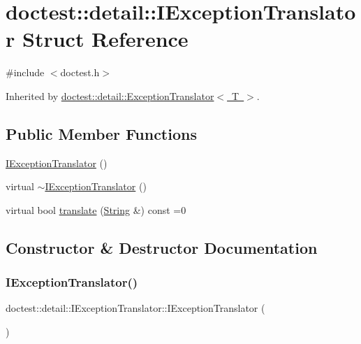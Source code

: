 \hypertarget{structdoctest_1_1detail_1_1_i_exception_translator}{}\section{doctest\+:\+:detail\+:\+:I\+Exception\+Translator Struct Reference}
\label{structdoctest_1_1detail_1_1_i_exception_translator}


{\ttfamily \#include $<$doctest.\+h$>$}



Inherited by \mbox{\hyperlink{classdoctest_1_1detail_1_1_exception_translator}{doctest\+::detail\+::\+Exception\+Translator$<$ T $>$}}.

\subsection*{Public Member Functions}
\begin{DoxyCompactItemize}
\item 
\mbox{\hyperlink{structdoctest_1_1detail_1_1_i_exception_translator_a3818157edf68f08110c7212ee87ff61e}{I\+Exception\+Translator}} ()
\item 
virtual \mbox{\hyperlink{structdoctest_1_1detail_1_1_i_exception_translator_a9031aa45964213709841eba4b3e19d48}{$\sim$\+I\+Exception\+Translator}} ()
\item 
virtual bool \mbox{\hyperlink{structdoctest_1_1detail_1_1_i_exception_translator_a9c56005e4c83c13b859cc2e31102bfbc}{translate}} (\mbox{\hyperlink{classdoctest_1_1_string}{String}} \&) const =0
\end{DoxyCompactItemize}


\subsection{Constructor \& Destructor Documentation}
\mbox{\label{structdoctest_1_1detail_1_1_i_exception_translator_a3818157edf68f08110c7212ee87ff61e}} 
\subsubsection{\texorpdfstring{I\+Exception\+Translator()}{IExceptionTranslator()}}
{\footnotesize\ttfamily doctest\+::detail\+::\+I\+Exception\+Translator\+::\+I\+Exception\+Translator (\begin{DoxyParamCaption}{ }\end{DoxyParamCaption})}

